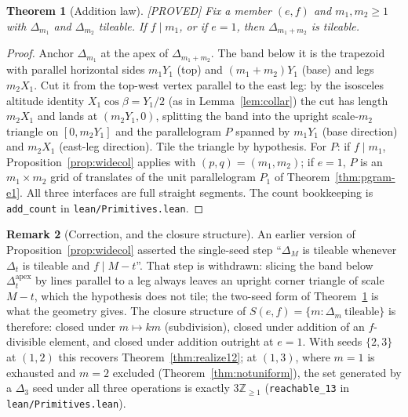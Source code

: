 \documentclass[11pt,reqno]{amsart}
\theoremstyle{plain}
\newtheorem{theorem}{Theorem}
\theoremstyle{definition}
\newtheorem{remark}[theorem]{Remark}
\newcommand{\Z}{\mathbb{Z}}
\newcommand{\lab}[1]{\hfill\textnormal{\footnotesize\textsc{[#1]}}}
\begin{document}
\begin{theorem}[Addition law]\label{thm:addlaw}\lab{PROVED}
Fix a member $(e,f)$ and $m_1,m_2\ge1$ with $\Delta_{m_1}$ and $\Delta_{m_2}$ tileable. If
$f\mid m_1$, or if $e=1$, then $\Delta_{m_1+m_2}$ is tileable.
\end{theorem}

\begin{proof}
Anchor $\Delta_{m_1}$ at the apex of $\Delta_{m_1+m_2}$. The band below it is the trapezoid with
parallel horizontal sides $m_1Y_1$ (top) and $(m_1+m_2)Y_1$ (base) and legs $m_2X_1$. Cut it from
the top-west vertex parallel to the east leg: by the isosceles altitude identity
$X_1\cos\beta=Y_1/2$ (as in Lemma~\ref{lem:collar}) the cut has length $m_2X_1$ and lands at
$(m_2Y_1,0)$, splitting the band into the upright scale-$m_2$ triangle on $[0,m_2Y_1]$ and the
parallelogram $P$ spanned by $m_1Y_1$ (base direction) and $m_2X_1$ (east-leg direction). Tile the
triangle by hypothesis. For $P$: if $f\mid m_1$, Proposition~\ref{prop:widecol} applies with
$(p,q)=(m_1,m_2)$; if $e=1$, $P$ is an $m_1\times m_2$ grid of translates of the unit
parallelogram $P_1$ of Theorem~\ref{thm:pgram-e1}. All three interfaces are full straight
segments. The count bookkeeping is \texttt{add\_count} in \textup{\texttt{lean/Primitives.lean}}.
\end{proof}

\begin{remark}[Correction, and the closure structure]\label{rem:widecolfix}
An earlier version of Proposition~\ref{prop:widecol} asserted the single-seed step ``$\Delta_M$ is
tileable whenever $\Delta_t$ is tileable and $f\mid M-t$''. That step is withdrawn: slicing the
band below $\Delta_t^{\mathrm{apex}}$ by lines parallel to a leg always leaves an upright corner
triangle of scale $M-t$, which the hypothesis does not tile; the two-seed form of
Theorem~\ref{thm:addlaw} is what the geometry gives. The closure structure of
$S(e,f)=\{m:\Delta_m\ \text{tileable}\}$ is therefore: closed under $m\mapsto km$ (subdivision),
closed under addition of an $f$-divisible element, and closed under addition outright at $e=1$.
With seeds $\{2,3\}$ at $(1,2)$ this recovers Theorem~\ref{thm:realize12}; at $(1,3)$, where
$m=1$ is exhausted and $m=2$ excluded (Theorem~\ref{thm:notuniform}), the set generated by a
$\Delta_3$ seed under all three operations is exactly $3\Z_{\ge1}$
(\texttt{reachable\_13} in \textup{\texttt{lean/Primitives.lean}}).
\end{remark}
\end{document}
